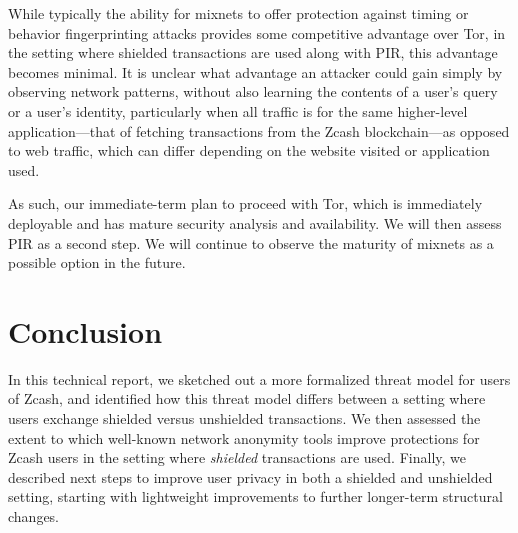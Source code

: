 \documentclass{article}
\begin{document}
While typically the
ability for mixnets to offer protection
against timing or behavior fingerprinting attacks provides some competitive
advantage over Tor, in the setting where shielded transactions are used along
with PIR, this advantage becomes minimal. It is unclear what advantage an
attacker could gain simply by observing network patterns, without also learning
the contents of a user's query or a user's identity, particularly when all
traffic is for the same higher-level application---that of fetching
transactions from the Zcash
blockchain---as opposed to web traffic, which can differ depending on the
website visited or application used.

As such, our immediate-term plan to proceed with Tor, which is
immediately deployable and has mature security analysis and availability. We
will then assess PIR as a second step. We will continue to observe the maturity
of mixnets as a possible option in the future.

\section{Conclusion}

In this technical report, we sketched out a more formalized threat model for
users of Zcash, and identified how this threat model differs between a setting
where users exchange shielded versus unshielded transactions. We then assessed
the extent to which well-known network anonymity tools improve protections for
Zcash users in the setting where \emph{shielded} transactions are used.
Finally, we described next steps to improve user privacy in both a shielded and
unshielded setting, starting with lightweight improvements to further
longer-term structural changes.



\end{document}
